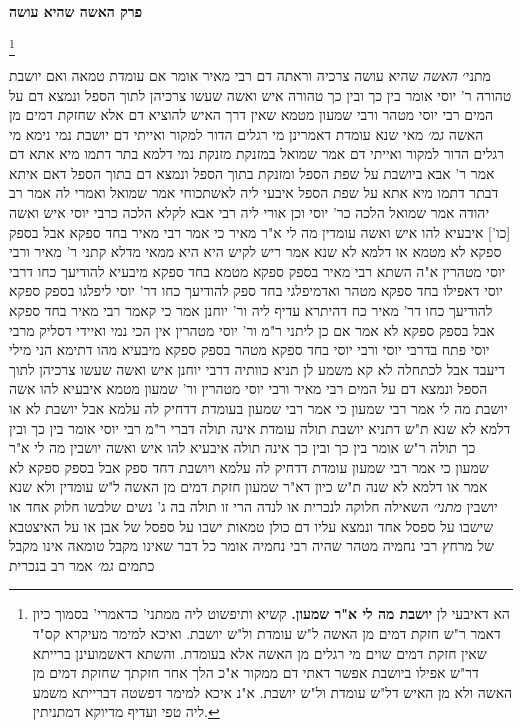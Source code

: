 \documentclass[12pt, openany]{book}
\newcommand{\sethebfont}{
\fontsize{10.5pt}{21.0pt} \selectfont
}
\newcommand{\twocol}[1]{
	{\sethebfont \begin{multicols}{2}
			#1
	\end{multicols}}	
}
\newcommand{\chapname}{}
\newcommand{\newchap}[1]{
	\addcontentsline{toc}{chapter}{#1}
	\renewcommand{\chapname}{#1}
		\begin{center}
			\textbf{%
\fontsize{16pt}{16pt}\selectfont
				#1}
		\end{center}
}
\newcommand{\footnotecomment}[1]{\footnote{#1}}
\newcommand{\commenta}[1]{\footnotecomment{#1}}
\begin{document}
\newchap{פרק  האשה שהיא עושה}
\twocol{
\commenta{ הא דאיבעי לן \textbf{יושבת מה לי א"ר שמעון.}  קשיא ותיפשוט ליה ממתני' כדאמרי' בסמוך כיון דאמר ר"ש חזקת דמים מן האשה ל"ש עומדת ול"ש יושבת. ואיכא למימר מעיקרא קס"ד שאין חזקת דמים שוים מי רגלים מן האשה אלא בעומדת. והשתא דאשמועינן ברייתא דר"ש אפילו ביושבת אפשר דאתי דם ממקור א"כ הלך אחר חזקתך שחזקת דמים מן האשה ולא מן האיש דל"ש עומדת ול"ש יושבת. א"נ איכא למימר דפשטה דברייתא משמע ליה טפי ועדיף מדיוקא דמתניתין. }

מתני׳ {\large\emph{האשה}} שהיא עושה צרכיה וראתה דם רבי מאיר אומר  אם עומדת טמאה ואם יושבת טהורה  ר' יוסי אומר  בין כך ובין כך טהורה 
איש ואשה שעשו צרכיהן לתוך הספל ונמצא דם על המים רבי יוסי מטהר ורבי שמעון מטמא שאין דרך האיש להוציא דם אלא שחזקת דמים מן האשה
{\large\emph{גמ׳}} מאי שנא עומדת דאמרינן מי רגלים הדור למקור ואייתי דם יושבת נמי נימא מי רגלים הדור למקור ואייתי דם
אמר שמואל  במזנקת  מזנקת נמי דלמא בתר דתמו מיא אתא דם 
אמר ר' אבא  ביושבת על שפת הספל ומזנקת בתוך הספל ונמצא דם בתוך הספל  דאם איתא דבתר דתמו מיא אתא על שפת הספל איבעי ליה לאשתכוחי 
אמר שמואל ואמרי לה אמר רב יהודה אמר שמואל  הלכה כר' יוסי  וכן אורי ליה רבי אבא לקלא  הלכה כרבי יוסי
איש ואשה [כו'] איבעיא להו  איש ואשה עומדין  מה לי א"ר מאיר 
כי אמר רבי מאיר בחד ספקא אבל בספק ספקא לא מטמא או דלמא לא שנא 
אמר ריש לקיש  היא היא ממאי מדלא קתני ר' מאיר ורבי יוסי מטהרין 
א"ה השתא רבי מאיר בספק ספקא מטמא בחד ספקא מיבעיא  להודיעך כחו דרבי יוסי דאפילו בחד ספקא מטהר 
ואדמיפלגי בחד ספק להודיעך כחו דר' יוסי ליפלגו בספק ספקא להודיעך כחו דר' מאיר  כח דהיתרא עדיף ליה 
ור' יוחנן אמר  כי קאמר רבי מאיר בחד ספקא  אבל בספק ספקא לא אמר  אם כן ליתני ר"מ ור' יוסי מטהרין  אין הכי נמי ואיידי דסליק מרבי יוסי פתח בדרבי יוסי 
ורבי יוסי בחד ספקא מטהר בספק ספקא מיבעיא  מהו דתימא  הני מילי דיעבד אבל לכתחלה לא קא משמע לן 
תניא כוותיה דרבי יוחנן  איש ואשה שעשו צרכיהן לתוך הספל ונמצא דם על המים רבי מאיר ורבי יוסי מטהרין ור' שמעון מטמא 
איבעיא להו  אשה יושבת מה לי אמר רבי שמעון  כי אמר רבי שמעון בעומדת דדחיק לה עלמא אבל יושבת לא  או דלמא לא שנא 
ת"ש  דתניא יושבת תולה עומדת אינה תולה דברי ר"מ  רבי יוסי אומר  בין כך ובין כך תולה  ר"ש אומר  בין כך ובין כך אינה תולה 
איבעיא להו  איש ואשה יושבין  מה לי א"ר שמעון  כי אמר רבי שמעון עומדת דדחיק לה עלמא ויושבת דחד ספק אבל בספק ספקא לא אמר  או דלמא לא שנה  
ת"ש  כיון דא"ר שמעון חזקת דמים מן האשה ל"ש עומדין ולא שנא יושבין
{\large\emph{מתני׳}} השאילה חלוקה לנכרית או לנדה הרי זו תולה בה
ג' נשים שלבשו חלוק אחד או שישבו על ספסל אחד ונמצא עליו דם כולן טמאות 
ישבו על ספסל של אבן או על האיצטבא של מרחץ רבי נחמיה מטהר  שהיה רבי נחמיה אומר  כל דבר שאינו מקבל טומאה אינו מקבל כתמים
{\large\emph{גמ׳}} אמר רב בנכרית}
\end{document}
